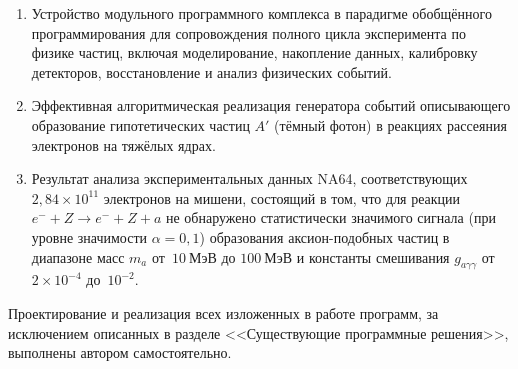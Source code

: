 {}
\begin{enumerate}[beginpenalty=10000]
    \item Устройство модульного программного комплекса
    в парадигме обобщённого программирования
    для сопровождения полного
    цикла эксперимента по физике частиц,
    включая моделирование,
    накопление данных,
    калибровку детекторов,
    восстановление и анализ физических событий.

    \item Эффективная алгоритмическая реализация генератора
    событий описывающего образование гипотетических
    частиц $A'$ (тёмный фотон) в реакциях рассеяния электронов
    на тяжёлых ядрах.
    
    \item Результат анализа экспериментальных данных NA64,
    соответствующих $2{,}84 \times 10^{11}$ электронов на мишени,
    состоящий в том, что
    для реакции $e^{-} + Z \rightarrow e^{-} + Z + a$ 
    не обнаружено статистически значимого сигнала (при уровне значимости
    $\alpha = 0{,}1$) образования аксион-подобных частиц в
    диапазоне масс $m_a$ от~$10~\text{МэВ}$ до $100~\text{МэВ}$ и константы
    смешивания $g_{a \gamma \gamma}$ от~$2\times10^{-4}$ до~$10^{-2}$.
\end{enumerate}

{\contribution} Проектирование и реализация всех изложенных в работе
программ, за исключением описанных в
разделе <<Существующие программные решения>>, выполнены автором самостоятельно.

